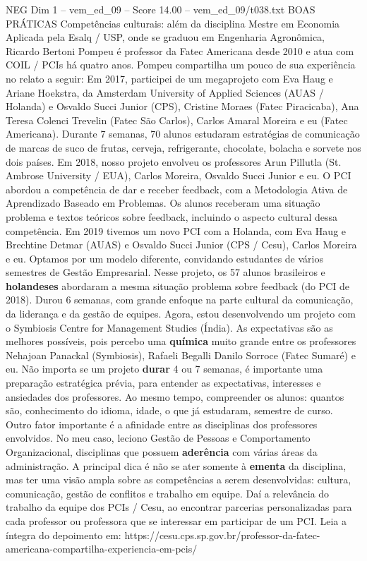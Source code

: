 \begin{textsample}{NEG Dim 1 – vem\_ed\_09 – Score 14.00 – vem\_ed\_09/t038.txt}  \label{ex:f1_neg_106}
BOAS PRÁTICAS Competências culturais: além da disciplina Mestre em Economia Aplicada pela Esalq / USP, onde se graduou em Engenharia Agronômica, Ricardo Bertoni Pompeu é professor da Fatec Americana desde 2010 e atua com COIL / PCIs há quatro anos.
Pompeu compartilha um pouco de sua experiência no relato a seguir: Em 2017, participei de um megaprojeto com Eva Haug e Ariane Hoekstra, da Amsterdam University of Applied Sciences (AUAS / Holanda) e Osvaldo Succi Junior (CPS), Cristine Moraes (Fatec Piracicaba), Ana Teresa Colenci Trevelin (Fatec São Carlos), Carlos Amaral Moreira e eu (Fatec Americana).
Durante 7 semanas, 70 alunos estudaram estratégias de comunicação de marcas de suco de frutas, cerveja, refrigerante, chocolate, bolacha e sorvete nos dois países.
Em 2018, nosso projeto envolveu os professores Arun Pillutla (St.
Ambrose University / EUA), Carlos Moreira, Osvaldo Succi Junior e eu.
O PCI abordou a competência de dar e receber feedback, com a Metodologia Ativa de Aprendizado Baseado em Problemas.
Os alunos receberam uma situação problema e textos teóricos sobre feedback, incluindo o aspecto cultural dessa competência.
Em 2019 tivemos um novo PCI com a Holanda, com Eva Haug e Brechtine Detmar (AUAS) e Osvaldo Succi Junior (CPS / Cesu), Carlos Moreira e eu.
Optamos por um modelo diferente, convidando estudantes de vários semestres de Gestão Empresarial.
Nesse projeto, os 57 alunos brasileiros e \textbf{holandeses} abordaram a mesma situação problema sobre feedback (do PCI de 2018).
Durou 6 semanas, com grande enfoque na parte cultural da comunicação, da liderança e da gestão de equipes.
Agora, estou desenvolvendo um projeto com o Symbiosis Centre for Management Studies (Índia).
As expectativas são as melhores possíveis, pois percebo uma \textbf{química} muito grande entre os professores Nehajoan Panackal (Symbiosis), Rafaeli Begalli Danilo Sorroce (Fatec Sumaré) e eu.
Não importa se um projeto \textbf{durar} 4 ou 7 semanas, é importante uma preparação estratégica prévia, para entender as expectativas, interesses e ansiedades dos professores.
Ao mesmo tempo, compreender os alunos: quantos são, conhecimento do idioma, idade, o que já estudaram, semestre de curso.
Outro fator importante é a afinidade entre as disciplinas dos professores envolvidos.
No meu caso, leciono Gestão de Pessoas e Comportamento Organizacional, disciplinas que possuem \textbf{aderência} com várias áreas da administração.
A principal dica é não se ater somente à \textbf{ementa} da disciplina, mas ter uma visão ampla sobre as competências a serem desenvolvidas: cultura, comunicação, gestão de conflitos e trabalho em equipe.
Daí a relevância do trabalho da equipe dos PCIs / Cesu, ao encontrar parcerias personalizadas para cada professor ou professora que se interessar em participar de um PCI.
Leia a íntegra do depoimento em: https://cesu.cps.sp.gov.br/professor-da-fatec-americana-compartilha-experiencia-em-pcis/

\end{textsample}
